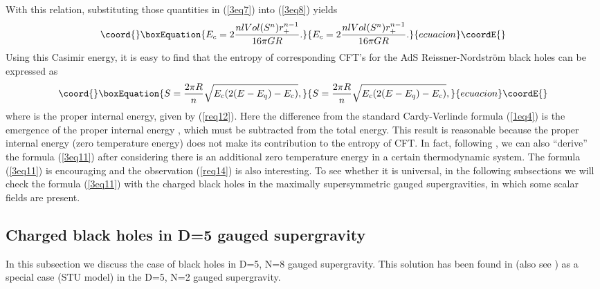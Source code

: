 \documentclass[a4paper,12pt]{article}
\begin{document}
With this relation, substituting those quantities in (\ref{3eq7}) into 
(\ref{3eq8}) yields
\begin{equation}\coord{}\boxEquation{
\label{3eq9}
E_c=2\frac{nl Vol(S^n)r_+^{n-1}}{16\pi GR}.
}{
E_c=2\frac{nl Vol(S^n)r_+^{n-1}}{16\pi GR}.
}{ecuacion}\coordE{}\end{equation}
Using this Casimir energy, it is easy to find that the entropy of corresponding
CFT's for the AdS Reissner-Nordstr\"om black holes can be expressed as
\begin{equation}\coord{}\boxEquation{
\label{3eq11}
S=\frac{2\pi R}{n}\sqrt{E_c(2(E-E_q)-E_c)},
}{
S=\frac{2\pi R}{n}\sqrt{E_c(2(E-E_q)-E_c)},
}{ecuacion}\coordE{}\end{equation}
where \coordHE{} is the proper internal energy, given by (\ref{req12}). 
Here the difference from the standard Cardy-Verlinde formula (\ref{1eq4}) 
is the emergence of the proper internal energy \coordHE{}, which must be subtracted 
from the total energy. This result is  reasonable because the proper internal
energy (zero temperature energy) does not make its contribution to the entropy
of CFT.  In fact, following \cite{Verl}, we can also ``derive'' the formula 
(\ref{3eq11}) after considering there is an additional zero temperature 
energy in a certain thermodynamic system. The formula (\ref{3eq11}) is 
encouraging and the 
observation (\ref{req14})
is also interesting.  To see whether it is universal, in the following 
subsections we will check the formula (\ref{3eq11}) with the charged black 
holes in the maximally supersymmetric gauged supergravities, in which some 
scalar fields are present.






\subsection{Charged black holes in D=5 gauged supergravity}

In this subsection we discuss the case of black holes in D=5, N=8 gauged
supergravity. This solution has been found in \cite{Behr} (also see  
\cite{Cvetic}) as a special case (STU model) in the D=5, N=2 gauged 
supergravity.
\end{document}
